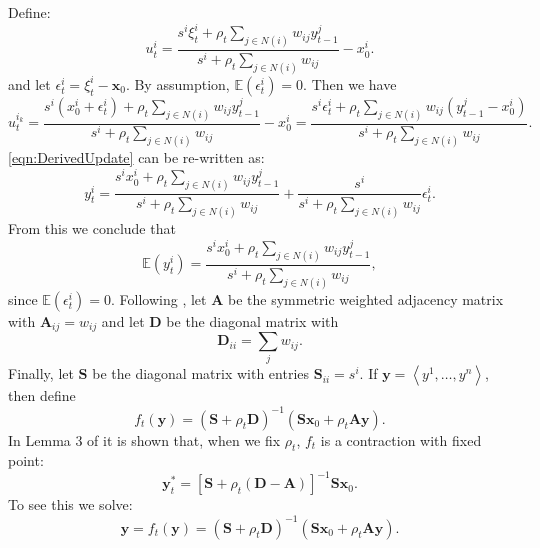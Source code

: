 \documentclass[aps,superscriptaddress,floatfix,amsmath,amssymb]{revtex4-2}
\begin{document}
Define:
\begin{displaymath}
u^{i}_t = \frac{s^i\xi_{t}^{i} + \rho_t \sum_{j \in N(i)} w_{ij} y_{t-1}^{j}}{s^i + \rho_t\sum_{j \in N(i)} w_{ij}} - x_{0}^{i}.
\end{displaymath}
and let $\epsilon^i_t = \xi_{t}^i - \mathbf{x}_0$. By assumption, $\mathbb{E}(\epsilon^i_t) = 0$. Then we have
\begin{equation*}
u^{i_k}_t = \frac{s^i\left(x_{0}^{i} + \epsilon_t^i\right) + \rho_t \sum_{j \in N(i)} w_{ij} y_{t-1}^{j}}{s^i + \rho_t\sum_{j \in N(i)} w_{ij}} - x_{0}^{i} =
 \frac{s^i\epsilon_t^i + \rho_t \sum_{j \in N(i)} w_{ij} \left(y_{t-1}^{j} - x_{0}^{i}\right)}{s^i + \rho_t\sum_{j \in N(i)} w_{ij}}.
\end{equation*}
\cref{eqn:DerivedUpdate} can be re-written as:
\begin{equation}
y^{i}_{t} = \frac{s^i x_{0}^{i} + \rho_t \sum_{j \in N(i)} w_{ij} y_{t-1}^{j}}{s^i + \rho_t\sum_{j \in N(i)} w_{ij}} + \frac{s^i}{s^i + \rho_t\sum_{j \in N(i)} w_{ij}}\epsilon_{t}^{i}.
\label{eqn:DerivedUpdate2}
\end{equation}
From this we conclude that 
\begin{equation}
\mathbb{E}\left(y^i_t\right) = \frac{s^i x_{0}^{i} + \rho_t \sum_{j \in N(i)} w_{ij} y_{t-1}^{j}}{s^i + \rho_t\sum_{j \in N(i)} w_{ij}},
\label{eqn:Expectation}
\end{equation}
since $\mathbb{E}(\epsilon^i_t) = 0$. Following \cite{SGSR18,G21}, let $\mathbf{A}$ be the symmetric weighted adjacency matrix with $\mathbf{A}_{ij} = w_{ij}$ and let $\mathbf{D}$ be the diagonal matrix with
\begin{equation*}
\mathbf{D}_{ii} = \sum_{j} w_{ij}.
\end{equation*}
Finally, let $\mathbf{S}$ be the diagonal matrix with entries $\mathbf{S}_{ii} = s^i$. If $\mathbf{y} = \left\langle{y^1,\dots,y^n}\right\rangle$, then define
\begin{equation*}
f_t(\mathbf{y}) = \left(\mathbf{S} + \rho_t\mathbf{D}\right)^{-1}\left(\mathbf{S}\mathbf{x}_0 + \rho_t\mathbf{A}\mathbf{y}\right).
\end{equation*}
In Lemma 3 of \cite{SGSR18} it is shown that, when we fix $\rho_t$, $f_t$ is a contraction with fixed point:
\begin{equation}
\mathbf{y}^*_t = \left[\mathbf{S}+\rho_t(\mathbf{D}-\mathbf{A})\right]^{-1}\mathbf{S}\mathbf{x}_0.
\label{eqn:xkstar}
\end{equation}
To see this we solve:
\begin{equation*}
\mathbf{y} = f_t(\mathbf{y}) = \left(\mathbf{S} + \rho_t\mathbf{D}\right)^{-1}\left(\mathbf{S}\mathbf{x}_0 + \rho_t\mathbf{A}\mathbf{y}\right).
\end{equation*}
\end{document}
